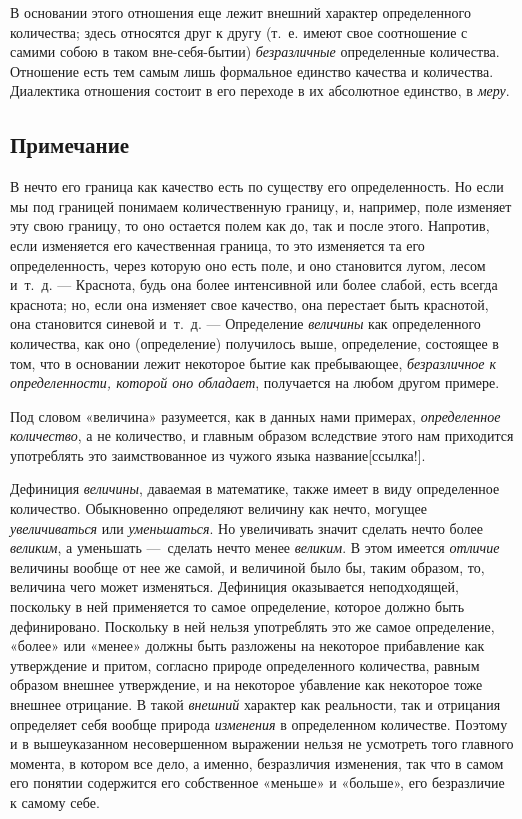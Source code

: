 В основании этого отношения еще лежит внешний характер определенного
количества; здесь относятся друг к другу (т.~е. имеют свое соотношение с
самими собою в таком вне-себя-бытии) {\em безразличные}
определенные количества. Отношение есть тем самым лишь формальное единство
качества и количества. Диалектика отношения состоит в его переходе в их
абсолютное единство, в {\em меру}.

\subsection*{Примечание}

В нечто его граница как качество есть по существу его определенность. Но
если мы под границей понимаем количественную границу, и, например, поле
изменяет эту свою границу, то оно остается полем как до, так и после этого.
Напротив, если изменяется его качественная граница, то это изменяется та
его определенность, через которую оно есть поле, и оно становится лугом,
лесом и~т.~д. — Краснота, будь она более интенсивной или более слабой, есть
всегда краснота; но, если она изменяет свое качество, она перестает быть
краснотой, она становится синевой и~т.~д. — Определение
{\em величины} как определенного количества, как оно
(определение) получилось выше, определение, состоящее в том, что в
основании лежит некоторое бытие как пребывающее,
{\em безразличное к определенности, которой оно
обладает}, получается на любом другом примере.

Под словом «величина» разумеется, как в данных нами примерах,
{\em определенное количество}, а не количество, и
главным образом вследствие этого нам приходится употреблять это
заимствованное из чужого языка
название[ссылка!].

Дефиниция {\em величины}, даваемая в математике, также
имеет в виду определенное количество. Обыкновенно определяют величину как
нечто, могущее {\em увеличиваться} или
{\em уменьшаться}. Но увеличивать значит сделать нечто
более {\em великим}, а уменьшать —~сделать нечто менее
{\em великим}. В этом имеется
{\em отличие} величины вообще от нее же самой, и
величиной было бы, таким образом, то, величина чего может изменяться.
Дефиниция оказывается неподходящей, поскольку в ней применяется то самое
определение, которое должно быть дефинировано. Поскольку в ней нельзя
употреблять это же самое определение, «более» или «менее» должны быть
разложены на некоторое прибавление как утверждение и притом, согласно
природе определенного количества, равным образом внешнее утверждение, и на
некоторое убавление как некоторое тоже внешнее отрицание. В такой
{\em внешний} характер как реальности, так и отрицания
определяет себя вообще природа {\em изменения} в
определенном количестве. Поэтому и в вышеуказанном несовершенном выражении
нельзя не усмотреть того главного момента, в котором все дело, а именно,
безразличия изменения, так что в самом его понятии содержится его
собственное «меньше» и «больше», его безразличие к самому себе.

